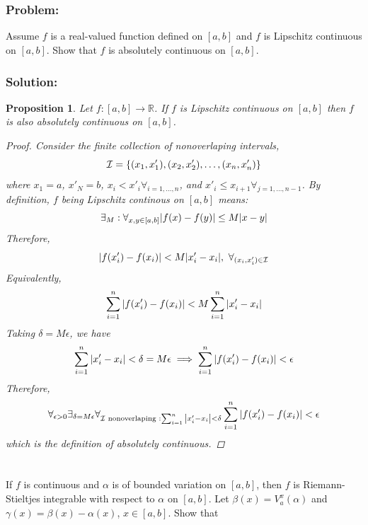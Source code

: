 \documentclass[]{article}
\newcommand{\R}{\mathbb{R}}
\newtheorem{proposition}{Proposition}
\begin{document}
\newpage
\section{}
\subsubsection*{Problem:}
Assume $f$ is a real-valued function defined on $[a,b]$ and $f$ is Lipschitz continuous on $[a,b]$. 
Show that $f$ is absolutely continuous on $[a,b]$.

\subsubsection*{Solution:}
\begin{proposition}
    Let $f : [a,b] \to \R$. 
    If $f$ is Lipschitz continuous on $[a,b]$ then $f$ is also absolutely continuous on $[a,b]$. 
    \begin{proof}
        Consider the finite collection of nonoverlaping intervals, \[
            \mathcal{I} = \qty{
                (x_1, x'_1),
                (x_2, x'_2),
                \dots,
                (x_n, x'_n)
            }
        \] where $x_1 = a$, $x'_N = b$, $x_i < x'_i \forall_{i = 1,\dots, n}$, and $x'_i \leq x_{i+1} \forall_{j = 1,\dots, n-1}$.
        By definition, $f$ being Lipschitz continous on $[a,b]$ means:\[
            \exists_{M} : \forall_{x,y \in [a,b]} \abs{f(x) - f(y)} \leq M \abs{x - y} 
        \] Therefore, \[
            \abs{f(x'_i) - f(x_i)} < M \abs{x'_i - x_i}, \ \forall_{(x_i, x'_i)\in\mathcal{I}}
        \] Equivalently, \[
            \sum_{i=1}^{n} \abs{f(x_i') - f(x_i)} < M \sum_{i=1}^{n} \abs{x_i' - x_i}
        \] Taking $\delta = M \epsilon$, we have \[
            \sum_{i=1}^{n} \abs{x_i' - x_i} < \delta = M \epsilon 
            \implies \sum_{i=1}^{n} \abs{f(x_i') - f(x_i)} < \epsilon
        \] Therefore, \[
            \forall_{\epsilon>0} \exists_{\delta = M \epsilon}
            \forall_{\mathcal{I} \text{ nonoverlaping }
                : \sum_{i=1}^{n} \abs{x_i' - x_i} < \delta
            } \sum_{i=1}^{n} \abs{f(x_i') - f(x_i)} < \epsilon
        \] which is the definition of absolutely continuous.
    \end{proof}
\end{proposition}

\newpage
\section{}
If $f$ is continuous and $\alpha$ is of bounded variation on $[a,b]$, then $f$ is Riemann-Stieltjes integrable with respect to $\alpha$ on $[a,b]$. 
Let $\beta(x) = V_{a}^{x}(\alpha)$ and $\gamma(x) = \beta(x) - \alpha(x)$, $x \in [a,b]$. 
Show that 
\end{document}
